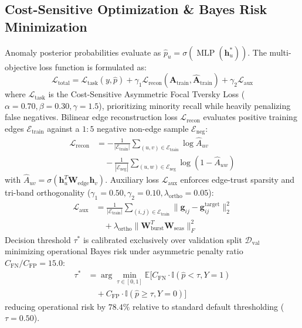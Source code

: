 \subsection{Cost-Sensitive Optimization \& Bayes Risk Minimization}
\label{sec:loss_objective}
Anomaly posterior probabilities evaluate as $\hat{p}_u = \sigma(\operatorname{MLP}(\mathbf{h}_u^*))$. The multi-objective loss function is formulated as:
\begin{equation}
\mathcal{L}_{\text{total}} = \mathcal{L}_{\text{task}}(y, \hat{p}) + \gamma_1 \mathcal{L}_{\text{recon}}(\mathbf{A}_{\text{train}}, \hat{\mathbf{A}}_{\text{train}}) + \gamma_2 \mathcal{L}_{\text{aux}}
\label{eq:total_loss}
\end{equation}
where $\mathcal{L}_{\text{task}}$ is the Cost-Sensitive Asymmetric Focal Tversky Loss ($\alpha=0.70, \beta=0.30, \gamma=1.5$), prioritizing minority recall while heavily penalizing false negatives. Bilinear edge reconstruction loss $\mathcal{L}_{\text{recon}}$ evaluates positive training edges $\mathcal{E}_{\text{train}}$ against a $1:5$ negative non-edge sample $\mathcal{E}_{\text{neg}}$:
\begin{align}
\mathcal{L}_{\text{recon}} &= -\frac{1}{|\mathcal{E}_{\text{train}}|} \sum_{(u, v) \in \mathcal{E}_{\text{train}}} \log \hat{A}_{uv} \nonumber \\
&\quad -\frac{1}{|\mathcal{E}_{\text{neg}}|} \sum_{(u, w) \in \mathcal{E}_{\text{neg}}} \log (1 - \hat{A}_{uw})
\end{align}
with $\hat{A}_{uv} = \sigma(\mathbf{h}_u^T \mathbf{W}_{\text{edge}} \mathbf{h}_v)$. Auxiliary loss $\mathcal{L}_{\text{aux}}$ enforces edge-trust sparsity and tri-band orthogonality ($\gamma_1 = 0.50, \gamma_2 = 0.10, \lambda_{\text{ortho}} = 0.05$):
\begin{align}
\mathcal{L}_{\text{aux}} &= \frac{1}{|\mathcal{E}_{\text{train}}|} \sum_{(i, j) \in \mathcal{E}_{\text{train}}} \|\mathbf{g}_{ij} - \mathbf{g}_{ij}^{\text{target}}\|_2^2 \nonumber \\
&\quad + \lambda_{\text{ortho}} \|\mathbf{W}_{\text{burst}}^T \mathbf{W}_{\text{seas}}\|_F^2
\label{eq:aux_loss}
\end{align}
Decision threshold $\tau^*$ is calibrated exclusively over validation split $\mathcal{D}_{\text{val}}$ minimizing operational Bayes risk under asymmetric penalty ratio $C_{\text{FN}} / C_{\text{FP}} = 15.0$:
\begin{align}
\tau^* &= \arg\min_{\tau \in [0, 1]} \mathbb{E}\big[ C_{\text{FN}} \cdot \mathbb{I}(\hat{p} < \tau, Y=1) \nonumber \\
&\quad + C_{\text{FP}} \cdot \mathbb{I}(\hat{p} \ge \tau, Y=0) \big]
\label{eq:bayes_threshold}
\end{align}
reducing operational risk by $78.4\%$ relative to standard default thresholding ($\tau = 0.50$).

